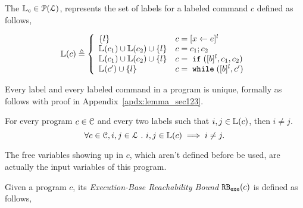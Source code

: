 The $\mathbb{L}_c \in \mathcal{P}(\mathcal{L})$,
represents the set of labels
for a labeled command $c$ defined as follows,
%
\begin{defn}
\label{def:lvar}
{\small
$$
  \lvar(c) \triangleq
  \left\{
  \begin{array}{ll}
      \{l\}                  
      & {c} = [{\assign x e}]^{l} 
      \\
      \lvar({c_1}) \cup \lvar({{c_2}})  \cup \{l\} 
      & {c} = {c_1};{c_2}
      \\
      \lvar(c_1) \cup \lvar({{c_2}}) \cup \{l\} 
      & {c} =\eif([\bexpr]^{l}, c_1, c_2) 
      \\
      \lvar({{c}'}) \cup \{l\} 
      & {c}   = \ewhile ([\bexpr]^{l}, {c}')
\end{array}
\right.
$$
}
\end{defn}
%
Every label and every labeled command in a program is unique, formally as follows with proof in Appendix~\ref{apdx:lemma_sec123}.
\begin{lem}
  \label{lem:label_unique}
  For every program $c \in \mathcal{C}$ and every two labels such that
  $i, j \in \mathbb{L}(c)$, then $i \neq j$.
  \[
    \forall c \in \mathcal{C}, i, j \in \mathcal{L} ~.~ i, j \in \mathbb{L}(c)\implies i \neq j.
    \]
\end{lem}
%
The free variables
showing up in $c$, which aren't defined before be used, are actually the input variables of this program.
%
\begin{defn}
  \label{def:exe_rb}
  Given a program ${c}$,
its \emph{Execution-Base Reachability Bound} 
$\mathtt{RB_{exe}}({c})$ is defined as follows,
%
\highlight{
\[
\begin{array}{l}
  \exeRB({c}) \triangleq
  \Big\{ 
  (l, w) 
  ~ \vert ~ 
  w : \mathcal{T} \to \mathbb{N}
  \land
  l \in \lvar(c) 
  \\ \qquad \qquad \qquad \qquad
  \land
  \forall \trace_0 \in \mathcal{T}_0(c), \trace \in \mathcal{T} \st 
  \config{{c}, \trace} \to^{*} \config{\eskip, \trace_0 \tracecat \vtrace} 
  \implies w(\trace_0) = \vcounter(\vtrace, l) 
\Big\}
\end{array}
\]
}
\end{defn}
